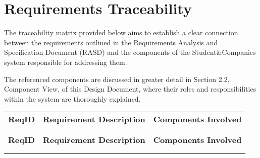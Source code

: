 \chapter{Requirements Traceability}

The traceability matrix provided below aims to establish a clear connection between the requirements outlined in the Requirements Analysis and Specification Document (RASD) and the components of the Student\&Companies system responsible for addressing them. 

The referenced components are discussed in greater detail in Section 2.2, Component View, of this Design Document, where their roles and responsibilities within the system are thoroughly explained.


\begin{longtable}{p{}p{}p{}}
    \textbf{ReqID} & \textbf{Requirement Description} & \textbf{Components Involved} \\
    \vspace{0.5em}\\
    \hline
    \vspace{0.5em}\\
    \endfirsthead
    \textbf{ReqID} & \textbf{Requirement Description} & \textbf{Components Involved} \\
    \vspace{0.5em}\\
    \hline
    \vspace{0.5em}\\
    \endhead


\end{longtable}

